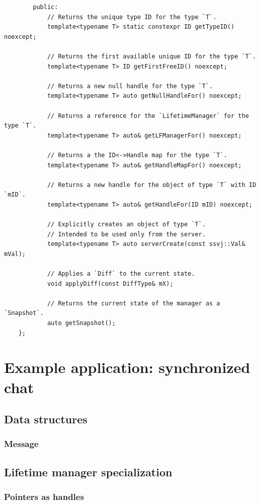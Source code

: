 \documentclass{report}
\begin{document}
\begin{verbatim}
        public:
            // Returns the unique type ID for the type `T`.
            template<typename T> static constexpr ID getTypeID() noexcept;

            // Returns the first available unique ID for the type `T`.
            template<typename T> ID getFirstFreeID() noexcept;

            // Returns a new null handle for the type `T`.
            template<typename T> auto getNullHandleFor() noexcept;
            
            // Returns a reference for the `LifetimeManager` for the type `T`.
            template<typename T> auto& getLFManagerFor() noexcept;

            // Returns a the ID<->Handle map for the type `T`.
            template<typename T> auto& getHandleMapFor() noexcept;

            // Returns a new handle for the object of type `T` with ID `mID`.
            template<typename T> auto& getHandleFor(ID mID) noexcept;

            // Explicitly creates an object of type `T`. 
            // Intended to be used only from the server.
            template<typename T> auto serverCreate(const ssvj::Val& mVal);

            // Applies a `Diff` to the current state.
            void applyDiff(const DiffType& mX);

            // Returns the current state of the manager as a `Snapshot`.
            auto getSnapshot();
    };
\end{verbatim}

    \newpage

    \chapter{Example application: synchronized chat}
        \section{Data structures}
            \subsection{Message}

        \section{Lifetime manager specialization}
            \subsection{Pointers as handles}
            
\end{document}
